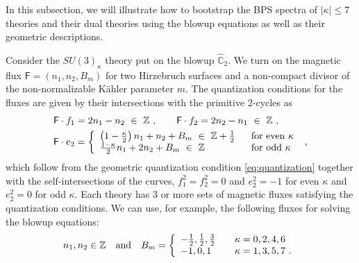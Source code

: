 In this subsection, we will illustrate how to bootstrap the BPS spectra of  $|\kappa| \le 7$ theories and their dual theories using the blowup equations as well as their geometric descriptions.

Consider the $SU(3)_\kappa$ theory put on the blowup $\hat{\mathbb{C}}_2$. We turn on the magnetic flux $\textsf{F}=(n_1,n_2,B_m)$ for two Hirzebruch surfaces and a non-compact divisor of the non-normalizable K\"ahler parameter $m$. The quantization conditions for the fluxes are given by their intersections with the primitive 2-cycles as
\begin{align}
	&\textsf{F}\cdot f_1 = 2n_1-n_2\ \in \ \mathbb{Z} \ , \qquad \textsf{F}\cdot f_2 = 2n_2-n_1 \ \in \ \mathbb{Z} \nonumber \ ,\\
	&  \textsf{F}\cdot e_2 = \left\{ \begin{array}{ll} \left(1-\tfrac{\kappa}{2}\right)n_1+n_2 + B_m \ \in \ \mathbb{Z}+\frac{1}{2} & \ \ {\rm for \ even}\ \kappa \\
	\frac{1-\kappa}{2}n_1+2n_2 + B_m \ \in \ \mathbb{Z} & \ \ {\rm for \ odd}\ \kappa 
	\end{array}\right. \ ,
\end{align}
which follow from the geometric quantization condition \eqref{eq:quantization} together with the self-intersections of the curves, $f_1^2 = f_2 ^2 = 0$ and $e_2^2 = -1$ for even $\kappa$ and $e_2^2=0$ for odd $\kappa$. Each theory has 3 or more sets of magnetic fluxes satisfying the quantization conditions. We can use, for example, the following fluxes for solving the blowup equations:
\begin{equation}\label{eq:su3_r}
	n_1,n_2 \in \mathbb{Z} \quad {\rm and} \quad B_m = \left\{
\begin{array}{ll}
-\frac{1}{2}, \frac{1}{2}, \frac{3}{2} & \quad \kappa = 0, 2, 4, 6 \\
-1, 0, 1 & \quad \kappa = 1, 3, 5, 7\ .
\end{array}\right.
\end{equation}

